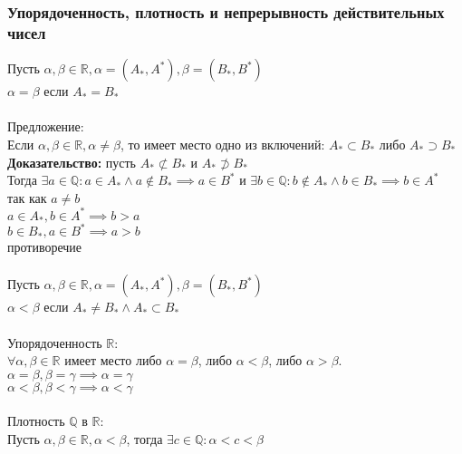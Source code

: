 \documentclass{article}
\begin{document}
        \subsubsection*{Упорядоченность, плотность и непрерывность действительных чисел}
        Пусть $\alpha, \beta \in \mathbb{R}, \alpha = (A_*, A^*), \beta = (B_*, B^*)$
        \\
        $\alpha = \beta$ если $A_* = B_*$
        \\     
        \\
        Предложение:
        \\
        Если $\alpha, \beta \in \mathbb{R}, \alpha \neq \beta$, то имеет место одно из включений: $A_* \subset B_*$ либо $A_* \supset B_*$
        \\
        \textbf{Доказательство:}
        пусть $A_* \not\subset B_*$ и $A_* \not\supset B_*$ 
        \\
        Тогда $\exists a \in \mathbb{Q}: a \in A_* \wedge a \notin B_* \implies a \in B^*$
        и $\exists b \in \mathbb{Q}: b \notin A_* \wedge b \in B_* \implies b \in A^*$
        \\
        так как $a \neq b$
        \\
        $a \in A_*, b \in A^* \implies b > a$
        \\
        $b \in B_*, a \in B^* \implies a > b$
        \\
        противоречие
        \\
        \\
        Пусть $\alpha, \beta \in \mathbb{R}, \alpha = (A_*, A^*), \beta = (B_*, B^*)$
        \\
        $\alpha < \beta$ если $A_* \neq B_* \wedge A_* \subset B_*$
        \\
        \\
        Упорядоченность $\mathbb{R}$:
        \\
        $\forall \alpha, \beta \in \mathbb{R}$ имеет место либо $\alpha = \beta$, либо $\alpha < \beta$,  либо $\alpha > \beta$.
        \\
        $ \alpha = \beta, \beta = \gamma \implies \alpha = \gamma$
        \\
        $ \alpha < \beta, \beta < \gamma \implies \alpha < \gamma$
        \\
        \\
        Плотность $\mathbb{Q}$ в $\mathbb{R}$:
        \\
        Пусть $\alpha, \beta \in \mathbb{R}, \alpha < \beta$, тогда $\exists c \in \mathbb{Q}: \alpha < c < \beta$
\end{document}
